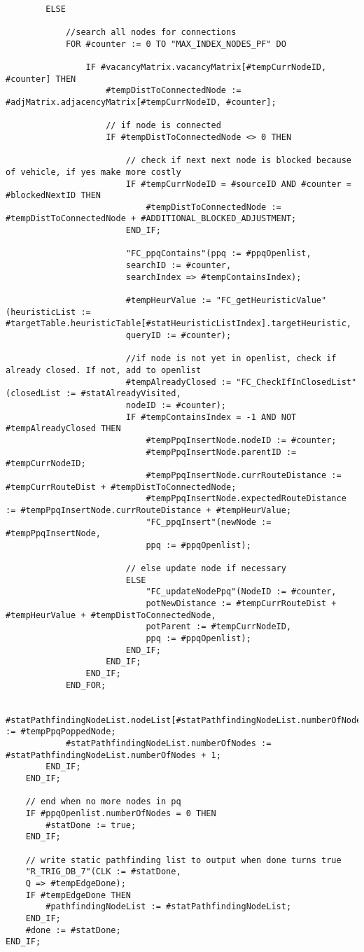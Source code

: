 \begin{lstlisting}
		
		ELSE
		
			//search all nodes for connections
			FOR #counter := 0 TO "MAX_INDEX_NODES_PF" DO
			
				IF #vacancyMatrix.vacancyMatrix[#tempCurrNodeID, #counter] THEN
					#tempDistToConnectedNode := #adjMatrix.adjacencyMatrix[#tempCurrNodeID, #counter];
					
					// if node is connected
					IF #tempDistToConnectedNode <> 0 THEN
					
						// check if next next node is blocked because of vehicle, if yes make more costly
						IF #tempCurrNodeID = #sourceID AND #counter = #blockedNextID THEN
							#tempDistToConnectedNode := #tempDistToConnectedNode + #ADDITIONAL_BLOCKED_ADJUSTMENT;
						END_IF;
						
						"FC_ppqContains"(ppq := #ppqOpenlist,
						searchID := #counter,
						searchIndex => #tempContainsIndex);
						
						#tempHeurValue := "FC_getHeuristicValue"(heuristicList := #targetTable.heuristicTable[#statHeuristicListIndex].targetHeuristic,
						queryID := #counter);
						
						//if node is not yet in openlist, check if already closed. If not, add to openlist
						#tempAlreadyClosed := "FC_CheckIfInClosedList"(closedList := #statAlreadyVisited,
						nodeID := #counter);
						IF #tempContainsIndex = -1 AND NOT #tempAlreadyClosed THEN
							#tempPpqInsertNode.nodeID := #counter;
							#tempPpqInsertNode.parentID := #tempCurrNodeID;
							#tempPpqInsertNode.currRouteDistance := #tempCurrRouteDist + #tempDistToConnectedNode;
							#tempPpqInsertNode.expectedRouteDistance := #tempPpqInsertNode.currRouteDistance + #tempHeurValue;
							"FC_ppqInsert"(newNode := #tempPpqInsertNode,
							ppq := #ppqOpenlist);
						
						// else update node if necessary
						ELSE
							"FC_updateNodePpq"(NodeID := #counter,
							potNewDistance := #tempCurrRouteDist + #tempHeurValue + #tempDistToConnectedNode,
							potParent := #tempCurrNodeID,
							ppq := #ppqOpenlist);
						END_IF;
					END_IF;
				END_IF;
			END_FOR;
			
			#statPathfindingNodeList.nodeList[#statPathfindingNodeList.numberOfNodes] := #tempPpqPoppedNode;
			#statPathfindingNodeList.numberOfNodes := #statPathfindingNodeList.numberOfNodes + 1;
		END_IF;
	END_IF;
	
	// end when no more nodes in pq
	IF #ppqOpenlist.numberOfNodes = 0 THEN
		#statDone := true;
	END_IF;
	
	// write static pathfinding list to output when done turns true
	"R_TRIG_DB_7"(CLK := #statDone,
	Q => #tempEdgeDone);
	IF #tempEdgeDone THEN
		#pathfindingNodeList := #statPathfindingNodeList;
	END_IF;
	#done := #statDone;
END_IF;
	\end{lstlisting}
	
